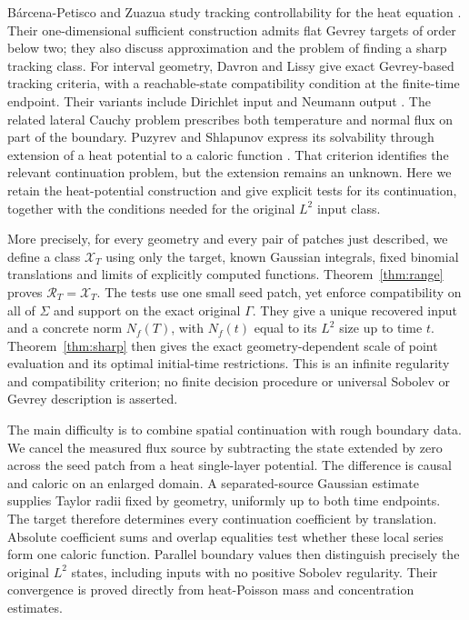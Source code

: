 \documentclass[11pt]{article}
\theoremstyle{remark}
\newcommand{\calX}{\mathcal X}
\newcommand{\calR}{\mathcal R}
\begin{document}
B\'arcena-Petisco and Zuazua study tracking controllability for the heat
equation \cite{BZ}. Their one-dimensional sufficient construction admits
flat Gevrey targets of order below two; they also discuss approximation
and the problem of finding a sharp tracking class.
For interval geometry, Davron and Lissy give exact Gevrey-based tracking
criteria, with a reachable-state compatibility condition at the finite-time
endpoint. Their variants include Dirichlet input and Neumann output
\cite[Theorems~1--2 and Section~3.1.2]{DL}.
The related lateral Cauchy problem prescribes both temperature and normal
flux on part of the boundary.
Puzyrev and Shlapunov express its solvability through extension of a heat
potential to a caloric function \cite[Theorem~2]{PS}.
That criterion identifies the relevant continuation problem, but the
extension remains an unknown.
Here we retain the heat-potential construction and give explicit tests
for its continuation, together with the conditions needed for the
original $L^2$ input class.

More precisely, for every geometry and every pair of patches just described,
we define a class $\calX_T$ using only the target, known Gaussian integrals,
fixed binomial translations and limits of explicitly computed functions.
Theorem~\ref{thm:range} proves $\calR_T=\calX_T$.
The tests use one small seed patch, yet enforce compatibility on all of
$\Sigma$ and support on the exact original $\Gamma$.
They give a unique recovered input and a concrete norm $N_f(T)$, with
$N_f(t)$ equal to its $L^2$ size up to time $t$.
Theorem~\ref{thm:sharp} then gives the exact geometry-dependent scale of
point evaluation and its optimal initial-time restrictions.
This is an infinite regularity and compatibility criterion; no
finite decision procedure or universal Sobolev or Gevrey description is
asserted.

The main difficulty is to combine spatial continuation with rough boundary
data. We cancel the measured flux source by subtracting the state extended
by zero across the seed patch from a heat single-layer potential.
The difference is causal and caloric on an enlarged domain.
A separated-source Gaussian estimate supplies Taylor radii fixed by
geometry, uniformly up to both time endpoints.
The target therefore determines every continuation coefficient by
translation. Absolute coefficient sums and overlap equalities test whether
these local series form one caloric function.
Parallel boundary values then distinguish precisely the original
$L^2$ states, including inputs with no positive Sobolev regularity.
Their convergence is proved directly from heat-Poisson mass and
concentration estimates.
\end{document}
